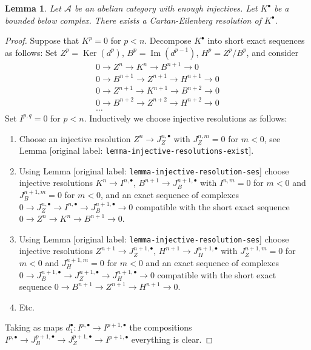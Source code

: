 \documentclass[10pt,a4paper]{article}
\theoremstyle{plain}
\newtheorem{lemma}[subsection]{Lemma}
\theoremstyle{definition}
\theoremstyle{remark}
\numberwithin{equation}{subsection}
\def\Ker{\mathop{\mathrm{Ker}}}
\def\Im{\mathop{\mathrm{Im}}}
\begin{document}
\begin{lemma}
\label{lemma-cartan-eilenberg}
Let $\mathcal{A}$ be an abelian category with enough injectives.
Let $K^\bullet$ be a bounded below complex.
There exists a Cartan-Eilenberg resolution of $K^\bullet$.
\end{lemma}

\begin{proof}
Suppose that $K^p = 0$ for $p < n$. Decompose $K^\bullet$ into
short exact sequences as follows: Set $Z^p = \Ker(d^p)$,
$B^p = \Im(d^{p - 1})$, $H^p = Z^p/B^p$, and consider
$$
\begin{matrix}
0 \to Z^n \to K^n \to B^{n + 1} \to 0 \\
0 \to B^{n + 1} \to Z^{n + 1} \to H^{n + 1} \to 0 \\
0 \to Z^{n + 1} \to K^{n + 1} \to B^{n + 2} \to 0 \\
0 \to B^{n + 2} \to Z^{n + 2} \to H^{n + 2} \to 0 \\
\ldots
\end{matrix}
$$
Set $I^{p, q} = 0$ for $p < n$. Inductively we choose
injective resolutions as follows:
\begin{enumerate}
\item Choose an injective resolution $Z^n \to J_Z^{n, \bullet}$
with $J_Z^{n, m} = 0$ for $m < 0$, see
Lemma [original label: \nolinkurl{lemma-injective-resolutions-exist}].
\item Using Lemma [original label: \nolinkurl{lemma-injective-resolution-ses}] choose injective
resolutions $K^n \to I^{n, \bullet}$, $B^{n + 1} \to J_B^{n + 1, \bullet}$
with $I^{n, m} = 0$ for $m < 0$ and $J_B^{n + 1, m} = 0$ for $m < 0$,
and an exact sequence of complexes
$0 \to J_Z^{n, \bullet} \to I^{n, \bullet} \to J_B^{n + 1, \bullet} \to 0$
compatible with the short exact sequence
$0 \to Z^n \to K^n \to B^{n + 1} \to 0$.
\item Using Lemma [original label: \nolinkurl{lemma-injective-resolution-ses}] choose injective
resolutions $Z^{n + 1} \to J_Z^{n + 1, \bullet}$,
$H^{n + 1} \to J_H^{n + 1, \bullet}$
with $J_Z^{n + 1, m} = 0$ for $m < 0$ and $J_H^{n + 1, m} = 0$ for $m < 0$
and an exact sequence of complexes
$0 \to J_B^{n + 1, \bullet} \to J_Z^{n + 1, \bullet}
\to J_H^{n + 1, \bullet} \to 0$
compatible with the short exact sequence
$0 \to B^{n + 1} \to Z^{n + 1} \to H^{n + 1} \to 0$.
\item Etc.
\end{enumerate}
Taking as maps $d_1^\bullet : I^{p, \bullet} \to I^{p + 1, \bullet}$
the compositions
$I^{p, \bullet} \to J_B^{p + 1, \bullet} \to
J_Z^{p + 1, \bullet} \to I^{p + 1, \bullet}$ everything is clear.
\end{proof}
\end{document}
